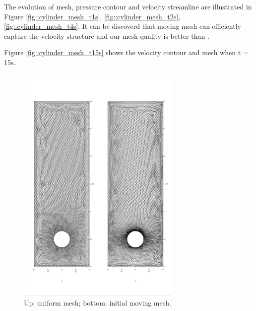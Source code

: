 \documentclass[a4paper, 11pt]{article}
\begin{document}
      The evolution of mesh, pressure contour and velocity streamline 
      are illustrated in Figure \ref{fig::cylinder_mesh_t1s},
      \ref{fig::cylinder_mesh_t2s},
      \ref{fig::cylinder_mesh_t4s}. It can be discoverd that moving
      mesh can efficiently capture the velocity structure and our mesh
      quality is better than \cite{cao1999anr}.
      
      Figure \ref{fig::cylinder_mesh_t15s} shows the velocity contour
      and mesh when t = 15s. 

      \begin{figure}[!htbp]
        \centering
        \includegraphics[width = 0.7\textwidth, angle = -90]{picture/obstacle_flow_data/initial_mesh.eps}
        \caption{\small Up: uniform mesh; bottom: initial
          moving mesh.}
        \label{fig::cylinder_initial_mesh}
      \end{figure}
\end{document}
